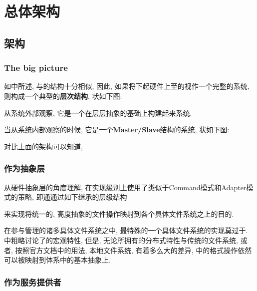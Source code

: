 \chapter{\HFS 总体架构}
\label{ch:hfs}

\section{\HFS 架构}
\label{sec:hfs:arch}

\subsection{The big picture}
\label{ssec:hfs:bigpic}

如中所述, {\HFS}与{\VFS}的结构十分相似,
因此, 如果将下起硬件上至{\HFS}的视作一个完整的系统, 则{\HFS}构成一个典型的\textbf{层次结构},
状如下图:


从系统外部观察{\HFS}, 它是一个在层层抽象的基础上构建起来系统.

当从系统内部观察{\HFS}的时候, 它是一个\textbf{Master/Slave}结构的系统, 状如下图:



对比上面的架构可以知道,

\subsection{作为抽象层}
\label{ssec:hfs:al}

从硬件抽象层的角度理解{\HFS},
{\HFS}在实现级别上使用了类似于Command模式和Adapter模式的策略,
即通通过如下继承的层级结构


来实现将统一的, 高度抽象的文件操作映射到各个具体文件系统之上的目的.

在{\HFS}参与管理的诸多具体文件系统之中, 最特殊的一个具体文件系统的实现莫过于{\HDFS}.
中粗略讨论了{\HDFS}的宏观特性,
但是, 无论{\HDFS}所拥有的分布式特性与传统的文件系统, 或者, 按照官方文档中的用法, 本地文件系统,
有着多么大的差异, {\HDFS}中的格式操作依然可以被映射到{\HFS}体系中的基本抽象上.


\subsection{作为服务提供者}
\label{ssec:hfs:srv}

